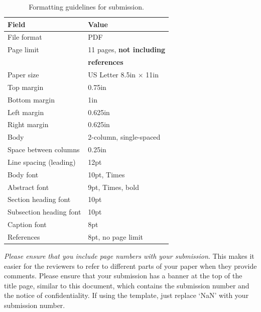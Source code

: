 \documentclass[conference]{IEEEtran}
\begin{document}
\begin{scriptsize}
\begin{table}[h!]
  \centering
  \caption{Formatting guidelines for submission.}
  \label{table:formatting}
  \begin{tabular}{|l|l|}
    \hline
    \textbf{Field} & \textbf{Value}\\
    \hline
    \hline
    File format & PDF \\
    \hline
    Page limit & 11 pages, {\bf not including}\\
               & {\bf references}\\
    \hline
    Paper size & US Letter 8.5in $\times$ 11in\\
    \hline
    Top margin & 0.75in \\
    \hline
    Bottom margin & 1in \\
    \hline
    Left margin & 0.625in \\
    \hline
    Right margin & 0.625in \\
    \hline
    Body & 2-column, single-spaced \\
    \hline
    Space between columns & 0.25in \\
    \hline
    Line spacing (leading) & 12pt \\
    \hline
    Body font & 10pt, Times \\
    \hline
    Abstract font & 9pt, Times, bold \\
    \hline
    Section heading font & 10pt \\
    \hline
    Subsection heading font & 10pt \\
    \hline
    Caption font & 8pt \\
    \hline
    References & 8pt, no page limit \\
    \hline
  \end{tabular}
\end{table}
\end{scriptsize}

{\em Please ensure that you include page numbers with your
  submission}. This makes it easier for the reviewers to refer to
different parts of your paper when they provide comments. Please
ensure that your submission has a banner at the top of the title page,
similar to this document, which contains the submission number and the
notice of confidentiality.  If using the template, just replace `NaN'
with your submission number.
\end{document}
